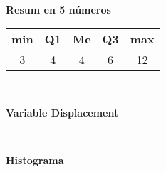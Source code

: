\begin{center} \bf Resum en 5 n\'umeros \end{center} 
\begin{center}
\begin{tabular}{c c c c c}
{\bf min} & {\bf Q1} & {\bf Me } & {\bf Q3} & {\bf max} \\
3 & 4 & 4 & 6 & 12 \\
\end{tabular}
\end{center} \vfill

\vspace{3ex}
\mbox{ } \vfill
\begin{center} \Large \bf Variable Displacement \end{center}

\mbox{ } \vfill
\begin{center}
{\hspace{60pt}\bf Histograma }\vspace{0.5em}


\end{center}
